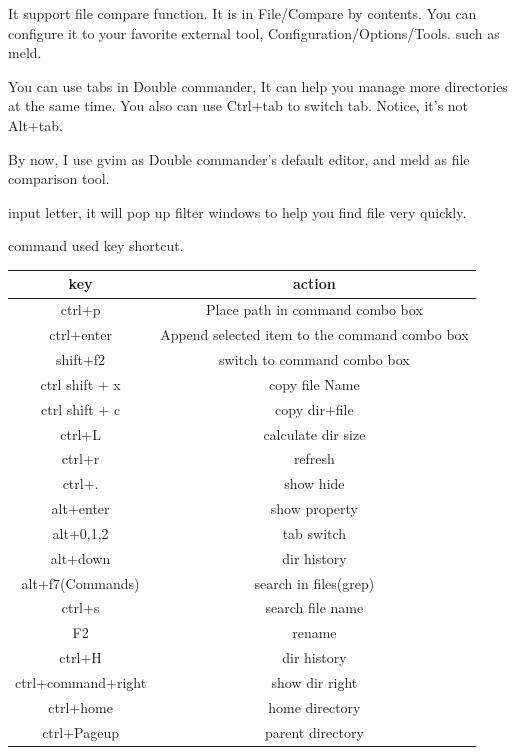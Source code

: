 \documentclass[paper=8.5in:11in, twoside, 12pt, pagesize=pdftex]{book}
\begin{document}
It support file compare function. It is in File/Compare by contents.  You can configure it to your favorite external tool, Configuration/Options/Tools. such as meld. 
	
You can use tabs in Double commander, It can help you manage more directories at the same time. You also can use Ctrl+tab to switch tab. Notice, it's not Alt+tab. 
	
By now, I use gvim as Double commander's default editor, and meld as file comparison tool. 
	
input letter, it will pop up filter windows to help you find file very quickly.
	
command used key shortcut.\\			
	
	\begin{tabular}{|c|c|}
		\hline 
		\textbf{key} & \textbf{action} \\ 
		\hline 
		ctrl+p & Place path in command combo box   \\ 
		\hline 
		ctrl+enter  & Append selected item to the command combo box \\ 
		\hline 
		shift+f2  & switch to command combo box \\ 
		
		\hline 
		ctrl shift + x & copy file Name \\ 
		\hline 
		ctrl shift + c & copy dir+file \\ 
		
		\hline \hline  
		ctrl+L & calculate dir size  \\ 
		\hline 
		ctrl+r & refresh  \\ 
		\hline 
		ctrl+.  & show hide  \\ 
		\hline 
		alt+enter & show property \\ 
		
		\hline 
		alt+0,1,2 & tab switch  \\ 
		\hline 
		alt+down & dir history  \\ 
		
		\hline 
		alt+f7(Commands) & search in files(grep) \\ 
		\hline 
		ctrl+s  & search file name \\ 
		\hline 
		F2  & rename \\ 
		\hline
		ctrl+H  & dir history \\ 
		
		\hline 
		ctrl+command+right  & show dir right  \\ 
		\hline 
		ctrl+home  & home directory \\ 
		\hline 
		ctrl+Pageup  & parent directory  \\ 
		\hline 
		
	\end{tabular} 
\end{document}
